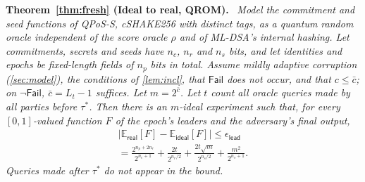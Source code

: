 \documentclass[10pt,journal,compsoc]{IEEEtran}
\theoremstyle{tplain}
\theoremstyle{tdef}
\theoremstyle{remark}
\newcommand{\RO}{\rho}
\newenvironment{restate}[1]{\par\smallskip\noindent\textbf{#1.}\ \itshape\ignorespaces}{\par\smallskip}
\begin{document}
\begin{restate}{Theorem~\ref{thm:fresh} (Ideal to real, QROM)}
Model the commitment and seed functions of QPoS-S, cSHAKE256 with distinct tags, as a quantum random oracle independent of the score oracle $\RO$ and of ML-DSA's internal hashing. Let commitments, secrets and seeds have $n_c$, $n_r$ and $n_s$ bits, and let identities and epochs be fixed-length fields of $n_p$ bits in total. Assume mildly adaptive corruption (\cref{sec:model}), the conditions of \cref{lem:incl}, that $\mathsf{Fail}$ does not occur, and that $c\le\bar c$; on $\neg\mathsf{Fail}$, $\bar c=L_t-1$ suffices. Let $m=2^{\bar c}$. Let $t$ count all oracle queries made by all parties before $\tau^\ast$. Then there is an $m$-ideal experiment such that, for every $[0,1]$-valued function $F$ of the epoch's leaders and the adversary's final output,
\begin{multline*}
\big|\mathbb E_{\mathsf{real}}[F]-\mathbb E_{\mathsf{ideal}}[F]\big|\le\epsilon_{\mathsf{lead}}\\=\frac{2^{n_p+2n_r}}{2^{n_c+1}}+\frac{2t}{2^{n_r/2}}+\frac{2t\sqrt m}{2^{n_s/2}}+\frac{m^2}{2^{n_s+1}}.
\end{multline*}
Queries made after $\tau^\ast$ do not appear in the bound.
\end{restate}
\end{document}
